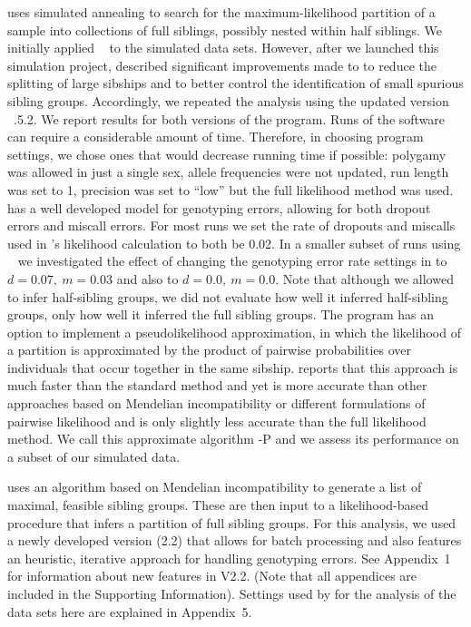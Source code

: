 \colony{} uses simulated annealing to search for the maximum-likelihood partition of a sample into 
collections of full siblings, possibly nested within half siblings. We initially applied \colony~{} to the simulated data 
sets.  However, after we launched this simulation project, \citet{Wang2013} described significant improvements made to \colony{} 
to reduce the splitting
of large sibships \citep{alm&and11} and to better control the identification of small spurious sibling groups.  
Accordingly, we repeated the analysis using the updated
version \colony~{.5.2}.  We report results for both versions of the program.  Runs of the software
\colony{} can require a considerable 
amount of time.  Therefore, in choosing program settings, we chose ones that would decrease running 
time if possible: polygamy was allowed in just a single sex, allele frequencies were not updated, run 
length was set to 1, precision was set to ``low'' but the full likelihood method was used. \colony{} 
has a well developed model for genotyping errors, allowing for both dropout errors and miscall errors. 
For most runs we set the rate of dropouts and miscalls used in \colony{}'s likelihood calculation to 
both be 0.02.  In a smaller subset of runs using \colony~{} we investigated the effect of changing the genotyping error 
rate settings in \colony{} to $d=0.07,\ m=0.03$ and also to $d=0.0,\ m=0.0$.    Note that although we 
allowed \colony{} to infer half-sibling groups, we did not evaluate how well it inferred half-sibling 
groups, only how well it inferred the full sibling groups. The program \colony{} has an option to 
implement a pseudolikelihood approximation, in which the likelihood of a partition is approximated by 
the product of pairwise probabilities over individuals that occur together in the same sibship. 
\citet{Wang2012pairwise} reports that this approach is much faster than the standard \colony{} method 
and yet is more accurate than other approaches based on Mendelian incompatibility or different 
formulations of pairwise likelihood and is only slightly less accurate than the full likelihood method.  
We call this approximate \colony{} algorithm \colony{}-P and we assess its performance on a subset of 
our simulated data. 



\prt{} uses an algorithm based on Mendelian incompatibility to generate a list of maximal, feasible 
sibling groups.  These are then input to a likelihood-based procedure that infers a partition of full 
sibling groups.  For this analysis, we used a newly developed version (2.2) that allows for batch 
processing and also features an heuristic, iterative approach for handling genotyping errors. See 
Appendix~1 for information about new features in V2.2. (Note that all appendices are included in the
Supporting Information).  Settings used by
\prt{} for the analysis of the data sets here are explained in Appendix~5. 



